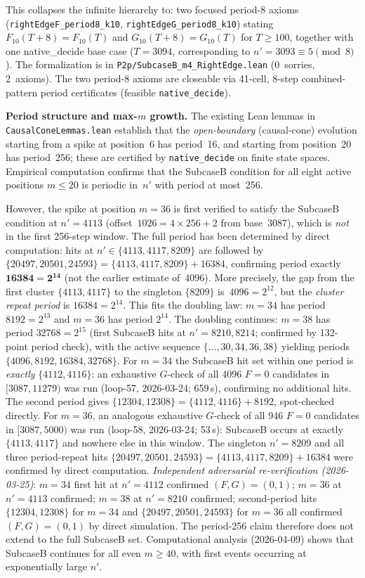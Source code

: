 \documentclass[11pt]{article}
\theoremstyle{plain}
\theoremstyle{definition}
\begin{document}
This collapses the infinite hierarchy to: two focused period-8 axioms (\texttt{rightEdgeF\_period8\_k10}, \texttt{rightEdgeG\_period8\_k10}) stating $F_{10}(T{+}8) = F_{10}(T)$ and $G_{10}(T{+}8) = G_{10}(T)$ for $T \geq 100$, together with one native\_decide base case ($T = 3094$, corresponding to $n' = 3093 \equiv 5 \pmod 8$). The formalization is in \texttt{P2p/SubcaseB\_m4\_RightEdge.lean} (0~sorries, 2~axioms). The two period-8 axioms are closeable via 41-cell, 8-step combined-pattern period certificates (feasible \texttt{native\_decide}).

\textbf{Period structure and max-$m$ growth.}  The existing Lean lemmas in
\texttt{CausalConeLemmas}\allowbreak\texttt{.lean} establish that the
\emph{open-boundary} (causal-cone)
evolution starting from a spike at position~6 has period~16, and starting from
position~20 has period~256; these are certified by \texttt{native\_decide} on finite
state spaces.  Empirical computation confirms that the SubcaseB condition for
all eight active positions $m \leq 20$
is periodic in~$n'$ with period at most~256.

However, the spike at position $m=36$ is first verified to satisfy the SubcaseB
condition at $n' = 4113$ (offset~$1026 = 4{\times}256+2$ from base~3087), which is
\emph{not} in the first 256-step window.  The full period has been determined by direct
computation: hits at $n' \in \{4113, 4117, 8209\}$ are followed by $\{20497, 20501, 24593\}
= \{4113, 4117, 8209\} + 16384$, confirming period exactly $\mathbf{16384 = 2^{14}}$
(not the earlier estimate of~4096).  More precisely, the gap from the first cluster
$\{4113,4117\}$ to the singleton $\{8209\}$ is~$4096 = 2^{12}$, but the \emph{cluster
repeat period} is $16384 = 2^{14}$.  This fits the doubling law: $m=34$ has
period $8192 = 2^{13}$ and $m=36$ has period $2^{14}$.  The doubling continues:
$m=38$ has period $32768 = 2^{15}$ (first SubcaseB hits at $n'=8210, 8214$;
confirmed by 132-point period check), with the active sequence
$\{\ldots, 30, 34, 36, 38\}$ yielding periods $\{4096, 8192, 16384, 32768\}$.
For $m=34$ the SubcaseB hit set within one period is \emph{exactly}
$\{4112, 4116\}$: an exhaustive $G$-check of all 4096 $F{=}0$ candidates
in $[3087, 11279)$ was run (loop-57, 2026-03-24; 659\,s), confirming no
additional hits.  The second period gives $\{12304, 12308\} = \{4112,4116\}+8192$,
spot-checked directly.
For $m=36$, an analogous exhaustive $G$-check of all 946 $F{=}0$ candidates
in $[3087, 5000)$ was run (loop-58, 2026-03-24; 53\,s): SubcaseB occurs at exactly
$\{4113, 4117\}$ and nowhere else in this window.  The singleton $n'=8209$ and all
three period-repeat hits $\{20497, 20501, 24593\} = \{4113,4117,8209\}+16384$
were confirmed by direct computation.
\emph{Independent adversarial re-verification (2026-03-25)}: $m=34$ first hit at $n'=4112$
confirmed $(F,G)=(0,1)$; $m=36$ at $n'=4113$ confirmed; $m=38$ at $n'=8210$ confirmed;
second-period hits $\{12304,12308\}$ for $m=34$ and $\{20497,20501,24593\}$ for $m=36$
all confirmed $(F,G)=(0,1)$ by direct simulation.
The period-256 claim therefore does not extend to the full SubcaseB set.
Computational analysis (2026-04-09) shows that SubcaseB continues for all even $m \geq 40$,
with first events occurring at exponentially large $n'$.
\end{document}
